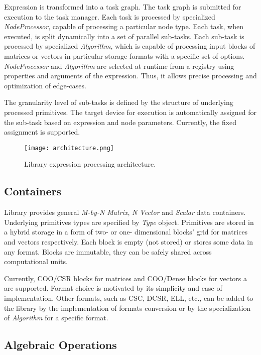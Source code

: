 Expression is transformed into a task graph. 
The task graph is submitted for execution to the task manager. 
Each task is processed by specialized \textit{NodeProcessor}, capable of processing a particular node type.
Each task, when executed, is split dynamically into a set of parallel sub-tasks. 
Each sub-task is processed by specialized \textit{Algorithm}, which is capable of processing input blocks of matrices or vectors in particular storage formats with a specific set of options. \textit{NodeProcessor} and \textit{Algorithm} are selected at runtime from a registry using properties and arguments of the expression. 
Thus, it allows precise processing and optimization of edge-cases.

The granularity level of sub-tasks is defined by the structure of underlying processed primitives. 
The target device for execution is automatically assigned for the sub-task based on expression and node parameters. 
Currently, the fixed assignment is supported.

\begin{figure}[t]
\centering
\texttt{[image: architecture.png]}
\caption{Library expression processing architecture.}
\label{fig:architecture}
\end{figure}
    
\subsection{Containers}

Library provides general \textit{M-by-N Matrix}, \textit{N Vector} and \textit{Scalar} data containers.
Underlying primitives types are specified by \textit{Type} object. 
Primitives are stored in a hybrid storage in a form of two- or one- dimensional blocks' grid for matrices and vectors respectively. 
Each block is empty (not stored) or stores some data in any format. Blocks are immutable, they can be safely shared across computational units.

Currently, COO/CSR blocks for matrices and COO/Dense blocks for vectors a are supported. Format choice is motivated by its simplicity and ease of implementation. 
Other formats, such as CSC, DCSR, ELL, etc., can be added to the library by the implementation of formats conversion or by the specialization of \textit{Algorithm} for a specific format.

\subsection{Algebraic Operations}

